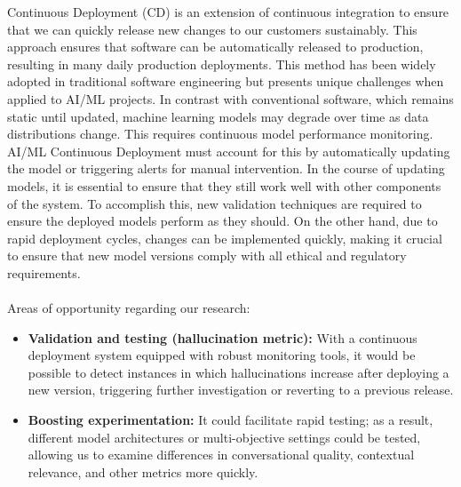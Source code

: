 \documentclass[11pt]{article}
\begin{document}
Continuous Deployment (CD) is an extension of continuous integration to ensure that we can quickly release new changes to our customers sustainably. This approach ensures that software can be automatically released to production, resulting in many daily production deployments. This method has been widely adopted in traditional software engineering but presents unique challenges when applied to AI/ML projects. In contrast with conventional software, which remains static until updated, machine learning models may degrade over time as data distributions change. This requires continuous model performance monitoring. AI/ML Continuous Deployment must account for this by automatically updating the model or triggering alerts for manual intervention. In the course of updating models, it is essential to ensure that they still work well with other components of the system. To accomplish this, new validation techniques are required to ensure the deployed models perform as they should. On the other hand, due to rapid deployment cycles, changes can be implemented quickly, making it crucial to ensure that new model versions comply with all ethical and regulatory requirements.\\\\
Areas of opportunity regarding our research:
\begin{itemize}
    \item \textbf{Validation and testing (hallucination metric):} With a continuous deployment system equipped with robust monitoring tools, it would be possible to detect instances in which hallucinations increase after deploying a new version, triggering further investigation or reverting to a previous release.
    \item \textbf{Boosting experimentation:} It could facilitate rapid testing; as a result, different model architectures or multi-objective settings could be tested, allowing us to examine differences in conversational quality, contextual relevance, and other metrics more quickly.
\end{itemize}
\end{document}
